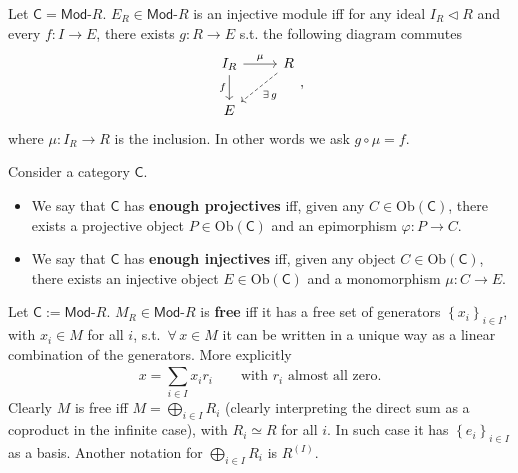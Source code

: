 \begin{prop}
	Let $\mathsf{C} = \mathsf{Mod}\text{-}R$.
	$E_R \in \mathsf{Mod}\text{-}R$ is an injective module iff
	for any ideal $I_R \triangleleft R$ and every $f: I \to E$, there exists $g: R \to E$ s.t.
	the following diagram commutes
	 \begin{equation}
	\begin{tikzcd}
		I_R \arrow[r, "\mu", rightarrow] \arrow[d, "f"', rightarrow] &
		R \arrow[ld, "\exists\, g", dashrightarrow] \\
		E &
	\end{tikzcd}
	,\end{equation} 
	where $\mu: I_R \to R$ is the inclusion.
	In other words we ask $g \circ \mu = f$.
\end{prop} 

\begin{defn}
	Consider a category $\mathsf{C}$.
	\begin{itemize}
		\item We say that $\mathsf{C}$ has \textbf{enough projectives} iff,
	given any $C \in \mathrm{Ob} \left(\mathsf{C}\right)$, 
	there exists a projective object $P \in \mathrm{Ob} \left(\mathsf{C}\right)$ and an epimorphism $\varphi: P \to C$.
	\item We say that $\mathsf{C}$ has \textbf{enough injectives} iff, 
		given any object $C \in \mathrm{Ob} \left(\mathsf{C}\right)$,
		there exists an injective object $E \in \mathrm{Ob} \left(\mathsf{C}\right)$ and a monomorphism
		$\mu: C \to E$.
	\end{itemize}
\end{defn}

\begin{defn}
	Let $\mathsf{C} := \mathsf{Mod}\text{-}R$.
	$M_R \in \mathsf{Mod}\text{-}R$ is \textbf{free} iff it has a free set of generators $\left\{ x_i \right\}_{i \in I}$, 
	with $x_i \in M$ for all $i$, s.t. $\,\forall\, x \in M$ it can be written in a unique way as a linear combination of the generators.
	More explicitly
	\begin{equation}
	x = \sum_{i \in I}^{} x_i r_i \qquad \text{with } r_i \text{ almost all zero}
	.\end{equation} 
	Clearly $M$ is free iff $M = \bigoplus_{i \in I}R_i$
	(clearly interpreting the direct sum as a coproduct in the infinite case),
	with $R_i \simeq R$ for all $i$.
	In such case it has $\left\{ e_i \right\}_{i \in I}$ as a basis.
	Another notation for $\bigoplus_{i \in I} R_i$ is $R^{(I)}$.
\end{defn}

